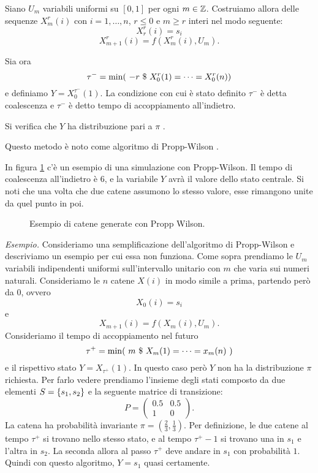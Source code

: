 \documentclass[]{marticle}
\begin{document}
Siano $U_m$ variabili uniformi su $[0,1]$ per ogni $m\in \mathbb{Z}$. Costruiamo allora
delle sequenze $X^r_m(i)$ con $i = 1,\dots,n$, $r\leq 0$ e $m \geq r$ interi nel
modo seguente:
\[
    X^r_r(i) = s_i
\]
\[
    X^r_{m+1}(i) = f(X^r_m(i), U_m).
\]

Sia ora 
\[
    \tau^-=\min(\ -r \ \$\  X^r_0(1) = \dots = X^r_0(n))
\]
e definiamo $Y = X^{\tau^-}_0(1)$. La condizione con cui \`e stato definito
$\tau^-$ \`e detta coalescenza e $\tau^-$ \`e detto tempo di accoppiamento
all'indietro.

Si verifica che $Y$ ha distribuzione pari a $\pi$ \cite{bremaud}.

Questo metodo \`e noto come algoritmo di Propp-Wilson \cite{propp-wilson}.

In figura \ref{fig:im1} c'\`e un esempio di una simulazione con Propp-Wilson. Il
tempo di coalescenza all'indietro \`e 6, e la variabile $Y$ avr\`a il valore
dello stato centrale. Si noti che una volta che due catene assumono lo stesso
valore, esse rimangono unite da quel punto in poi.

\begin{figure}[h!]

\caption{Esempio di catene generate con Propp Wilson.}
\label{fig:im1}
\centering
\end{figure}


\textit{Esempio.} Consideriamo una semplificazione dell'algoritmo di
Propp-Wilson e descriviamo un esempio per cui essa non funziona. Come sopra
prendiamo le $U_m$ variabili indipendenti uniformi sull'intervallo unitario con
$m$ che varia sui numeri naturali. Consideriamo le $n$ catene $X(i)$ in modo
simile a prima, partendo per\`o da 0, ovvero
\[
    X_0(i) = s_i
\]
e
\[
    X_{m+1}(i) = f(X_m(i), U_m).
\]
Consideriamo il tempo di accoppiamento nel futuro
\[
    \tau^+ = \min(\ m \st X_m(1) = \dots = x_m(n)\ )
\]
e il rispettivo stato $Y = X_{\tau^+}(1)$. In questo caso per\`o $Y$ non ha la
distribuzione $\pi$ richiesta. 
Per farlo vedere prendiamo l'insieme degli stati composto da due elementi $S =
\{s_1, s_2\}$ e la seguente matrice di transizione:
\[
    P = 
    \begin{pmatrix}
        0.5 & 0.5 \\
        1  & 0
    \end{pmatrix}.
\]
La catena ha probabilit\`a invariante $\pi = (\frac{2}{3}, \frac{1}{3})$. Per
definizione, le due catene al tempo $\tau^+$ si trovano nello stesso stato, e al
tempo $\tau^+-1$ si trovano una in $s_1$ e l'altra in $s_2$. La seconda allora
al passo $\tau^+$ deve andare in $s_1$ con probabilit\`a $1$. Quindi con questo
algoritmo, $Y=s_1$ quasi certamente.
\end{document}
